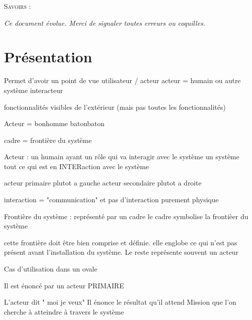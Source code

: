 \documentclass[11pt,oneside]{article}
\begin{document}
\begin{savoir}
\textsc{Savoirs :}
\end{savoir}
 

\setlength{\parskip}{0ex plus 0.2ex minus 0ex}
 \renewcommand{\contentsname}{}
 \renewcommand{\baselinestretch}{1}

\tableofcontents

 \renewcommand{\baselinestretch}{1.2}
\setlength{\parskip}{2ex plus 0.5ex minus 0.2ex}

\textit{Ce document évolue. Merci de signaler toutes erreurs ou coquilles.}

\section{Présentation}
\begin{defi}

\end{defi}

Permet d'avoir un point de vue utilisateur / acteur
acteur = humain ou autre système interacteur

fonctionnalités visibles de l'extérieur (mais pas toutes les fonctionnalités)


Acteur = bonhomme batonbaton

cadre = frontière du système



Acteur : 
un humain ayant un rôle qui va interagir avec le système
un système
tout ce qui est en INTERaction avec le système

acteur primaire plutot a gauche
acteur secondaire plutot a droite

interaction = "communication" et pas d'interaction purement physique


Frontière du système : représenté par un cadre
le cadre symbolise la frontièer du système

cette frontière doit être bien comprise et définie. 
elle englobe ce qui n'est pas présent avant l'installation du système.
Le reste représente souvent un acteur



Cas d'utilisation dans un ovale

Il est énoncé par un acteur PRIMAIRE

L'acteur dit " moi je veux"
Il énonce le résultat qu'il attend
Mission que l'on cherche à atteindre à travers le système
\end{document}
